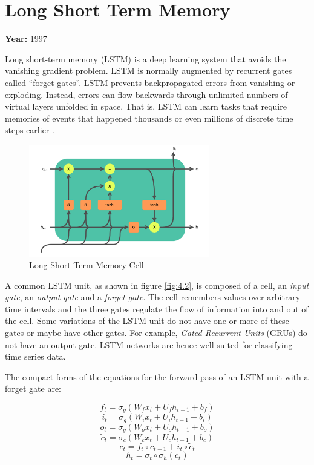 \documentclass[12pt, a4paper]{report}
\begin{document}
\section{Long Short Term Memory}
\label{sec:lstm}

\textbf{Year:} 1997

Long short-term memory (LSTM) is a deep learning system that avoids the vanishing gradient problem. LSTM is normally augmented by recurrent gates called ``forget gates''. LSTM prevents backpropagated errors from vanishing or exploding. Instead, errors can flow backwards through unlimited numbers of virtual layers unfolded in space. That is, LSTM can learn tasks that require memories of events that happened thousands or even millions of discrete time steps earlier \cite{wiki:rnns}.

\begin{figure}[!htbp]
    \centering
    \includegraphics[width=0.7\textwidth]{LSTM_cell.png}
    \caption[Long Short Term Memory Cell]{Long Short Term Memory Cell \cite{wiki:lstm}}
    \label{fig:4.2}
\end{figure}

A common LSTM unit, as shown in figure \eqref{fig:4.2}, is composed of a cell, an \emph{input gate}, an \emph{output gate} and a \emph{forget gate}. The cell remembers values over arbitrary time intervals and the three gates regulate the flow of information into and out of the cell. Some variations of the LSTM unit do not have one or more of these gates or maybe have other gates. For example, \emph{Gated Recurrent Units} (GRUs) do not have an output gate. LSTM networks are hence well-suited for classifying time series data.

The compact forms of the equations for the forward pass of an LSTM unit with a forget gate are:

\[f_t = \sigma_g(W_f x_t + U_f h_{t-1} + b_f)\]
\[i_t = \sigma_g(W_i x_t + U_i h_{t-1} + b_i)\]
\[o_t = \sigma_g(W_o x_t + U_o h_{t-1} + b_o)\]
\[\tilde{c}_t = \sigma_c(W_c x_t + U_c h_{t-1} + b_c)\]
\[c_t = f_t \circ c_{t-1} + i_t \circ \tilde{c}_t\]
\begin{equation}
    h_t = \sigma_t \circ \sigma_h(c_t)
\end{equation}
\end{document}

